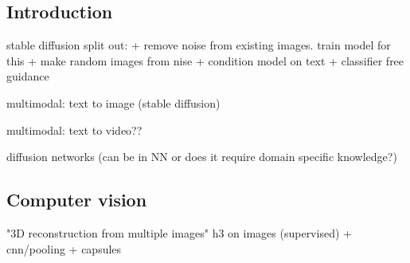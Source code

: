 
\subsection{Introduction}

stable diffusion split out:
+ remove noise from existing images. train model for this
+ make random images from nise
+ condition model on text
+ classifier free guidance


multimodal: text to image (stable diffusion)

multimodal: text to video??

diffusion networks (can be in NN or does it require domain specific knowledge?)

\subsection{Computer vision}
"3D reconstruction from multiple images"
h3 on images (supervised)
+ cnn/pooling
+ capsules


